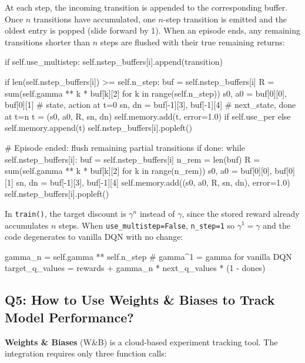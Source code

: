 \documentclass[12pt,a4paper]{report}
\begin{document}
At each step, the incoming transition is appended to the corresponding buffer.
Once $n$ transitions have accumulated, one $n$-step transition is emitted and
the oldest entry is popped (slide forward by 1).
When an episode ends, any remaining transitions shorter than $n$ steps are
flushed with their true remaining returns:

\begin{pycode}
if self.use_multistep:
    self.nstep_buffers[i].append(transition)

    if len(self.nstep_buffers[i]) >= self.n_step:
        buf = self.nstep_buffers[i]
        R      = sum(self.gamma ** k * buf[k][2] for k in range(self.n_step))
        s0, a0 = buf[0][0], buf[0][1]    # state, action at t=0
        sn, dn = buf[-1][3], buf[-1][4]  # next_state, done at t=n
        t = (s0, a0, R, sn, dn)
        self.memory.add(t, error=1.0) if self.use_per else self.memory.append(t)
        self.nstep_buffers[i].popleft()

    # Episode ended: flush remaining partial transitions
    if done:
        while self.nstep_buffers[i]:
            buf   = self.nstep_buffers[i]
            n_rem = len(buf)
            R     = sum(self.gamma ** k * buf[k][2] for k in range(n_rem))
            s0, a0 = buf[0][0], buf[0][1]
            sn, dn = buf[-1][3], buf[-1][4]
            self.memory.add((s0, a0, R, sn, dn), error=1.0)
            self.nstep_buffers[i].popleft()
\end{pycode}

In \texttt{train()}, the target discount is $\gamma^n$ instead of $\gamma$,
since the stored reward already accumulates $n$ steps.
When \texttt{use\_multistep=False}, \texttt{n\_step=1} so $\gamma^1 = \gamma$
and the code degenerates to vanilla DQN with no change:

\begin{pycode}
gamma_n         = self.gamma ** self.n_step          # gamma^1 = gamma for vanilla DQN
target_q_values = rewards + gamma_n * next_q_values * (1 - dones)
\end{pycode}

\subsection*{Q5: How to Use Weights \& Biases to Track Model Performance?}

\textbf{Weights \& Biases} (W\&B) is a cloud-based experiment tracking tool.
The integration requires only three function calls:
\end{document}
